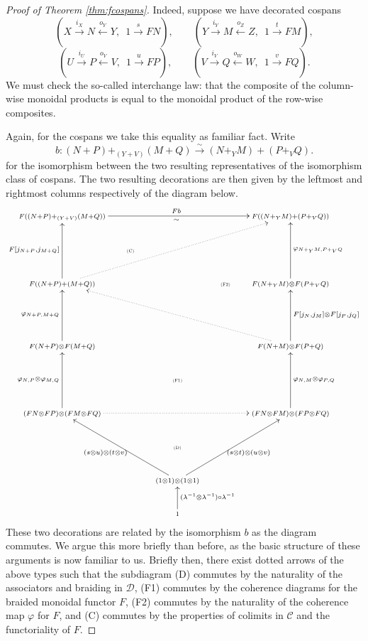 \begin{proof}[Proof of Theorem \ref{thm:fcospans}]
  Indeed, suppose we have decorated cospans
\[
  (X \stackrel{i_X}\longrightarrow N \stackrel{o_Y}\longleftarrow Y,\enspace 1
  \stackrel{s}\longrightarrow FN),
  \qquad
  (Y \stackrel{i_Y}\longrightarrow M \stackrel{o_Z}\longleftarrow Z,\enspace 1
  \stackrel{t}\longrightarrow FM), 
\]
\[
  (U \stackrel{i_U}\longrightarrow P \stackrel{o_V}\longleftarrow V,\enspace 1
  \stackrel{u}\longrightarrow FP),
  \qquad
  (V \stackrel{i_V}\longrightarrow Q \stackrel{o_W}\longleftarrow W,\enspace 1
  \stackrel{v}\longrightarrow FQ). 
\]
We must check the so-called interchange law: that the composite of the
column-wise monoidal products is equal to the monoidal product of the row-wise
composites.

Again, for the cospans we take this equality as familiar fact. Write 
\[
  b\colon  (N+P)+_{(Y+V)}(M+Q) \stackrel{\sim}{\longrightarrow} (N+_YM)+(P+_{V}Q).
\]
for the isomorphism between the two resulting representatives of the isomorphism
class of cospans. The two resulting decorations are then given by the leftmost 
and rightmost columns respectively of the diagram below.
\[
  \xymatrixcolsep{1.4pc}
  \xymatrix{ 
    \scriptstyle F((N+P)+_{(Y+V)}(M+Q)) \ar[rrrr]^{Fb}_{\sim} &&&&
    \scriptstyle F((N+_YM)+(P+_VQ)) \\
    & \textsc{\tiny(C)} \\
    \scriptstyle F((N+P)+(M+Q)) \ar[uu]^{F[j_{N+P},j_{M+Q}]} \ar@{.>}[uurrrr] &&&
    \textsc{\tiny(F2)} & \scriptstyle F(N+_YM)\otimes F(P+_VQ)
    \ar[uu]_{\varphi_{N+_YM,P+_VQ}} \\
    \\
    \scriptstyle F(N+P)\otimes F(M+Q) \ar[uu]^{\varphi_{N+P,M+Q}} &&&&
    \scriptstyle F(N+M)\otimes F(P+Q) \ar@{.>}[uullll]
    \ar[uu]_{F[j_N,j_M] \otimes F[j_P,j_Q]} \\
    && \textsc{\tiny(F1)} \\
    \scriptstyle (FN \otimes FP) \otimes (FM \otimes FQ) \ar[uu]^{\varphi_{N,P} \otimes
    \varphi_{M,Q}} \ar@{.>}[rrrr] &&&& \scriptstyle (FN \otimes FM) \otimes (FP \otimes FQ)
    \ar[uu]_{\varphi_{N,M} \otimes \varphi_{P,Q}} \\
    && \textsc{\tiny(D)} \\
    && \scriptstyle (1\otimes1)\otimes(1\otimes1) \ar[uull]^{(s\otimes u) \otimes (t \otimes
    v)} \ar[uurr]_{(s \otimes t) \otimes (u \otimes v)} \\
    && \scriptstyle 1 \ar[u]_{(\lambda^{-1}\otimes\lambda^{-1})\circ\lambda^{-1}}
  }
\]
These two decorations are related by the isomorphism $b$ as the diagram
commutes. We argue this more briefly than before, as the basic structure of
these arguments is now familiar to us. Briefly then, there exist dotted arrows
of the above types such that the subdiagram (D) commutes by the naturality of
the associators and braiding in $\mathcal D$, (F1) commutes by the coherence
diagrams for the braided monoidal functor $F$, (F2) commutes by the naturality of
the coherence map $\varphi$ for $F$, and (C) commutes by the properties of
colimits in $\mathcal C$ and the functoriality of $F$. 


\end{proof}
